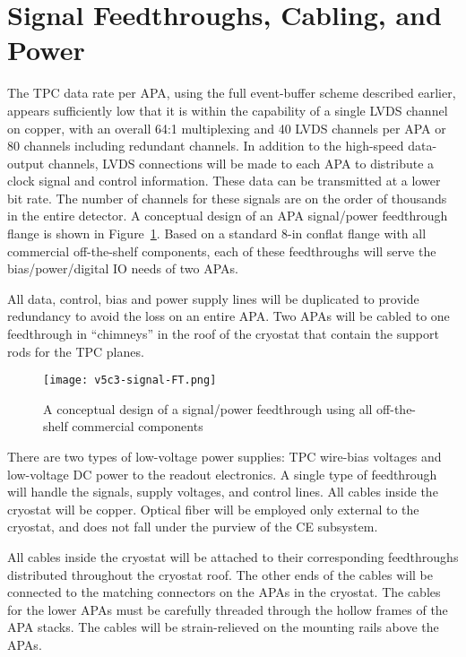 %
\section{Signal Feedthroughs, Cabling, and Power}
\label{sec:ce-feedthrough}

The TPC data rate per APA, using the full event-buffer scheme described earlier,
appears sufficiently low that it is within the capability of a single LVDS channel on copper, with an overall 64:1
multiplexing and 40 LVDS channels per APA or 80 channels including redundant channels.
In addition to the high-speed data-output channels,
LVDS connections will be made to each APA to distribute a clock signal and control information.
These data can be transmitted at a lower bit rate.
The number of channels for these signals are on the order of thousands in the entire detector.
A conceptual design of an APA signal/power feedthrough flange is shown in Figure~\ref{fig:ce-feedthrough}.
Based on a standard 8-in conflat flange with all commercial off-the-shelf components,
each of these feedthroughs will serve the bias/power/digital IO needs of two APAs.  

All data, control, bias and power supply lines will be duplicated to
provide redundancy to avoid the loss on an entire APA.
Two APAs will be cabled to one feedthrough in ``chimneys'' in the roof of the cryostat that
contain the support rods for the TPC planes.

\begin{figure}[htbp]
\centering
\texttt{[image: v5c3-signal-FT.png]}
\caption[Conceptual design of signal/power feedthrough]{A conceptual design of a signal/power feedthrough using all off-the-shelf commercial components}
\label{fig:ce-feedthrough}
\end{figure}

There are two types of low-voltage power supplies:
TPC wire-bias voltages and low-voltage DC power to the readout electronics.
A single type of feedthrough will handle the signals, supply voltages, and control lines.
All cables inside the cryostat will be copper.
Optical fiber will be employed only external to the cryostat, and does not fall under the purview of the CE subsystem.

All cables inside the cryostat will be attached to their corresponding feedthroughs distributed throughout the cryostat roof.
The other ends of the cables will be connected to the matching connectors on the APAs in the cryostat.
The cables for the lower APAs must be carefully threaded through the hollow frames of the APA stacks.
The cables will be strain-relieved on the  mounting rails above the APAs. 

